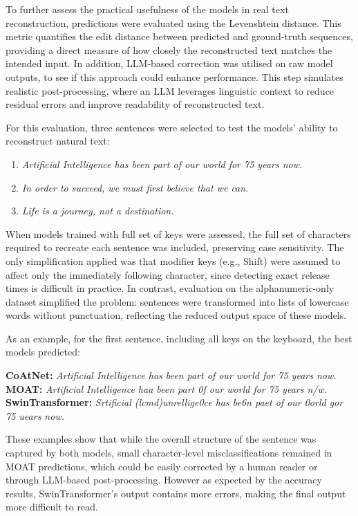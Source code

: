 \documentclass[a4paper,11pt,twoside]{report}
\theoremstyle{definition}
\begin{document}
To further assess the practical usefulness of the models in real text reconstruction, predictions were evaluated using the Levenshtein distance. This metric quantifies the edit distance between predicted and ground-truth sequences, providing a direct measure of how closely the reconstructed text matches the intended input. In addition, LLM-based correction was utilised on raw model outputs, to see if this approach could enhance performance. This step simulates realistic post-processing, where an LLM leverages linguistic context to reduce residual errors and improve readability of reconstructed text.

For this evaluation, three sentences were selected to test the models’ ability to reconstruct natural text:
\begin{enumerate}
  \item \textit{Artificial Intelligence has been part of our world for 75 years now.}
  \item \textit{In order to succeed, we must first believe that we can.}
  \item \textit{Life is a journey, not a destination.}
\end{enumerate}

When models trained with full set of keys were assessed, the full set of characters required to recreate each sentence was included, preserving case sensitivity. The only simplification applied was that modifier keys (e.g., Shift) were assumed to affect only the immediately following character, since detecting exact release times is difficult in practice. In contrast, evaluation on the alphanumeric-only dataset simplified the problem: sentences were transformed into lists of lowercase words without punctuation, reflecting the reduced output space of these models.

As an example, for the first sentence, including all keys on the keyboard, the best models predicted:

\begin{center}
\textbf{CoAtNet:} \textit{Artificial Intelligence has been part of our world for 75 years now.} \\
\textbf{MOAT:} \textit{Artificial Intelligence haa been part 0f our world for 75 years n/w.}
\textbf{SwinTransformer:} \textit{Srtificial (lcmd)unrellige0ce has be6n paet of our 0orld gor 75 uears now.}
\end{center}

These examples show that while the overall structure of the sentence was captured by both models, small character-level misclassifications remained in MOAT predictions, which could be easily corrected by a human reader or through LLM-based post-processing. However as expected by the accuracy results, SwinTransformer's output contains more errors, making the final output more difficult to read.
\end{document}
